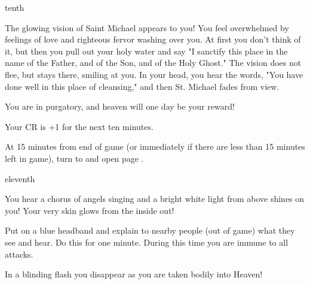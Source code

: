 \documentclass[greennotebook]{guildcamp4} %
\begin{document}
\begin{page}{tenth}

The glowing vision of Saint Michael appears to you! You feel overwhelmed by feelings of love and righteous fervor washing over you. At first you don't think of it, but then you pull out your holy water and say "I sanctify this place in the name of the Father, and of the Son, and of the Holy Ghost." The vision does not flee, but stays there, smiling at you. In your head, you hear the words, "You have done well in this place of cleansing," and then St. Michael fades from view. 

You are in purgatory, and heaven will one day be your reward!

Your CR is +1 for the next ten minutes.

At 15 minutes from end of game (or immediately if there are less than 15 minutes left in game), turn to and open page .

\end{page}

\begin{page}{eleventh}

You hear a chorus of angels singing and a bright white light from above shines on you! Your very skin glows from the inside out!

Put on a blue headband and explain to nearby people (out of game) what they see and hear. Do this for one minute. During this time you are immune to all attacks.

In a blinding flash you disappear as you are taken bodily into Heaven!

\end{page}

\endnotebook
\end{document}
